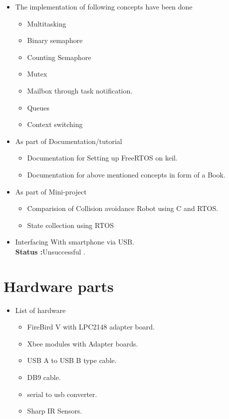 \documentclass[a4paper,12pt,oneside]{book}
\begin{document}
\begin{itemize}

\item The implementation of following concepts have been done 
\begin{itemize}
    \item Multitasking
    \item Binary semaphore
    \item Counting Semaphore
    \item Mutex
    \item Mailbox through task notification.
    \item Queues
    \item Context switching
\end{itemize}

\item As part of Documentation/tutorial
\begin{itemize}
  \item Documentation for Setting up FreeRTOS on keil.   
  \item Documentation for above mentioned concepts in form of a Book.
\end{itemize}
\item As part of Mini-project
\begin{itemize}
  \item Comparision of Collision avoidance Robot using C and RTOS.
  \item State collection using RTOS
\end{itemize}
\item Interfacing With smartphone via USB.\\
    \textbf{Status :}Unsuccessful .
\end{itemize}
\newpage
\section{Hardware parts}
\begin{itemize}
  \item List of hardware 
  \begin{itemize}
    \item FireBird V with LPC2148 adapter board.
    \item Xbee modules with Adapter boards.
    \item USB A to USB B type cable.
    \item DB9 cable.
    \item serial to usb converter.
    \item Sharp IR Sensors.
  \end{itemize}
\end{itemize}
\end{document}
